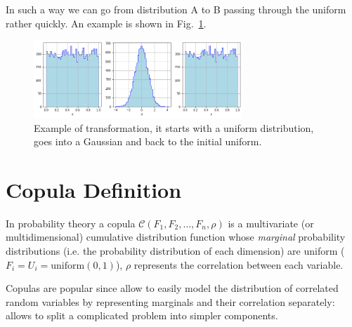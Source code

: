 In such a way we can go from distribution A to B passing through the uniform rather quickly. An example is shown in Fig.~\ref{fig:a_to_b_to_a}.

\begin{figure}[htbp]
\centering
\includegraphics[width=0.7\textwidth]{figures/a_to_b_to_a}
\caption{Example of transformation, it starts with a uniform distribution, goes into a Gaussian and back to the initial uniform.}
\label{fig:a_to_b_to_a}
\end{figure}

\section{Copula Definition}
\label{copula}




In probability theory a copula $\mathcal{C}(F_1, F_2, \ldots, F_n, \rho)$ is a multivariate (or multidimensional) cumulative distribution function whose \emph{marginal} probability distributions (i.e. the probability distribution of each dimension) are uniform ($F_i = U_i =\mathrm{uniform}(0,1)$), \(\rho\) represents the correlation between each variable.

Copulas are popular since allow to easily model the distribution of correlated random variables by representing marginals and their correlation separately: allows to split a complicated problem into simpler components.

